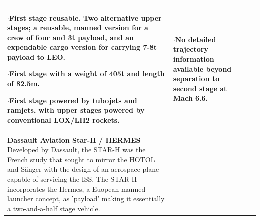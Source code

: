 {\begin{landscape}
\begin{xltabular}{\linewidth}{|X|X|X|}
	$\cdot$First stage reusable. Two alternative upper stages; a reusable, manned version for a crew of four and 3t payload, and an expendable cargo version for carrying 7-8t payload to LEO. 
	
	$\cdot$First stage with a weight of 405t and length of 82.5m. 
	
	$\cdot$First stage powered by tubojets and ramjets, with upper stages powered by conventional LOX/LH2 rockets. 
	
	&\small
	$\cdot$No detailed trajectory information available beyond separation to second stage at Mach 6.6. 
	\\
	\hline \small 
	\textbf{Dassault Aviation Star-H / HERMES} \cite{Aberleen}\newline\newline
Developed by Dassault, the STAR-H was the French study that sought to mirror the HOTOL and S{\"a}nger with the design of an aerospace plane capable of servicing the ISS. The STAR-H incorporates the Hermes, a Euopean manned launcher concept, as 'payload' making it essentially a two-and-a-half stage vehicle. 
	
	
	&\small
{}


\end{xltabular}
\end{landscape}}
